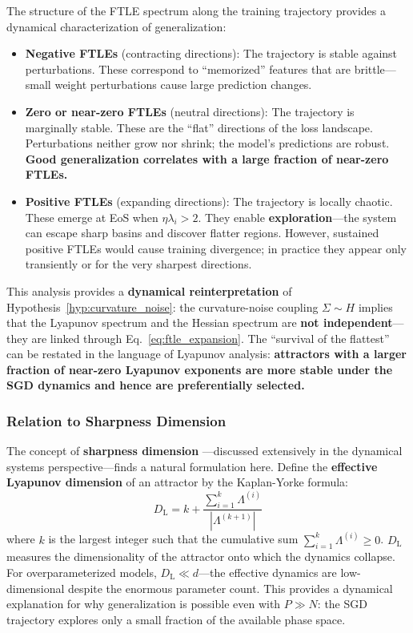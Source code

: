 \documentclass[
  journal=largetwo,
  simfonts=false,
  year=2025,
  volume=37,
]{cup-journal}
\begin{document}
The structure of the FTLE spectrum along the training trajectory provides a dynamical characterization of generalization:
\begin{itemize}
    \item \textbf{Negative FTLEs} (contracting directions): The trajectory is stable against perturbations. These correspond to ``memorized'' features that are brittle---small weight perturbations cause large prediction changes.
    \item \textbf{Zero or near-zero FTLEs} (neutral directions): The trajectory is marginally stable. These are the ``flat'' directions of the loss landscape. Perturbations neither grow nor shrink; the model's predictions are robust. \textbf{Good generalization correlates with a large fraction of near-zero FTLEs.}
    \item \textbf{Positive FTLEs} (expanding directions): The trajectory is locally chaotic. These emerge at EoS when $\eta \lambda_i > 2$. They enable \textbf{exploration}---the system can escape sharp basins and discover flatter regions. However, sustained positive FTLEs would cause training divergence; in practice they appear only transiently or for the very sharpest directions.
\end{itemize}

This analysis provides a \textbf{dynamical reinterpretation} of Hypothesis~\ref{hyp:curvature_noise}: the curvature-noise coupling $\Sigma \sim H$ implies that the Lyapunov spectrum and the Hessian spectrum are \textbf{not independent}---they are linked through Eq.~\eqref{eq:ftle_expansion}. The ``survival of the flattest'' can be restated in the language of Lyapunov analysis: \textbf{attractors with a larger fraction of near-zero Lyapunov exponents are more stable under the SGD dynamics and hence are preferentially selected.}

\subsubsection{Relation to Sharpness Dimension}

The concept of \textbf{sharpness dimension} \cite{cohen2021gradient}---discussed extensively in the dynamical systems perspective---finds a natural formulation here. Define the \textbf{effective Lyapunov dimension} of an attractor by the Kaplan-Yorke formula:
\begin{equation}\label{eq:lyapunov_dim}
    D_{\mathrm{L}} = k + \frac{\sum_{i=1}^{k} \Lambda^{(i)}}{|\Lambda^{(k+1)}|}
\end{equation}
where $k$ is the largest integer such that the cumulative sum $\sum_{i=1}^{k} \Lambda^{(i)} \geq 0$. $D_{\mathrm{L}}$ measures the dimensionality of the attractor onto which the dynamics collapse. For overparameterized models, $D_{\mathrm{L}} \ll d$---the effective dynamics are low-dimensional despite the enormous parameter count. This provides a dynamical explanation for why generalization is possible even with $P \gg N$: the SGD trajectory explores only a small fraction of the available phase space.
\end{document}
